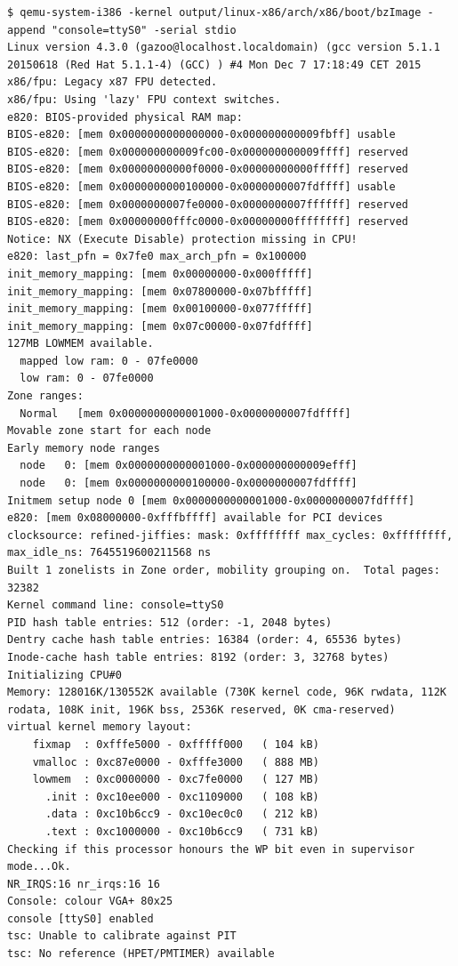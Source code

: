 \documentclass[a4paper]{article}
\begin{document}
\begin{verbatim}
$ qemu-system-i386 -kernel output/linux-x86/arch/x86/boot/bzImage -append "console=ttyS0" -serial stdio
Linux version 4.3.0 (gazoo@localhost.localdomain) (gcc version 5.1.1 20150618 (Red Hat 5.1.1-4) (GCC) ) #4 Mon Dec 7 17:18:49 CET 2015
x86/fpu: Legacy x87 FPU detected.
x86/fpu: Using 'lazy' FPU context switches.
e820: BIOS-provided physical RAM map:
BIOS-e820: [mem 0x0000000000000000-0x000000000009fbff] usable
BIOS-e820: [mem 0x000000000009fc00-0x000000000009ffff] reserved
BIOS-e820: [mem 0x00000000000f0000-0x00000000000fffff] reserved
BIOS-e820: [mem 0x0000000000100000-0x0000000007fdffff] usable
BIOS-e820: [mem 0x0000000007fe0000-0x0000000007ffffff] reserved
BIOS-e820: [mem 0x00000000fffc0000-0x00000000ffffffff] reserved
Notice: NX (Execute Disable) protection missing in CPU!
e820: last_pfn = 0x7fe0 max_arch_pfn = 0x100000
init_memory_mapping: [mem 0x00000000-0x000fffff]
init_memory_mapping: [mem 0x07800000-0x07bfffff]
init_memory_mapping: [mem 0x00100000-0x077fffff]
init_memory_mapping: [mem 0x07c00000-0x07fdffff]
127MB LOWMEM available.
  mapped low ram: 0 - 07fe0000
  low ram: 0 - 07fe0000
Zone ranges:
  Normal   [mem 0x0000000000001000-0x0000000007fdffff]
Movable zone start for each node
Early memory node ranges
  node   0: [mem 0x0000000000001000-0x000000000009efff]
  node   0: [mem 0x0000000000100000-0x0000000007fdffff]
Initmem setup node 0 [mem 0x0000000000001000-0x0000000007fdffff]
e820: [mem 0x08000000-0xfffbffff] available for PCI devices
clocksource: refined-jiffies: mask: 0xffffffff max_cycles: 0xffffffff, max_idle_ns: 7645519600211568 ns
Built 1 zonelists in Zone order, mobility grouping on.  Total pages: 32382
Kernel command line: console=ttyS0
PID hash table entries: 512 (order: -1, 2048 bytes)
Dentry cache hash table entries: 16384 (order: 4, 65536 bytes)
Inode-cache hash table entries: 8192 (order: 3, 32768 bytes)
Initializing CPU#0
Memory: 128016K/130552K available (730K kernel code, 96K rwdata, 112K rodata, 108K init, 196K bss, 2536K reserved, 0K cma-reserved)
virtual kernel memory layout:
    fixmap  : 0xfffe5000 - 0xfffff000   ( 104 kB)
    vmalloc : 0xc87e0000 - 0xfffe3000   ( 888 MB)
    lowmem  : 0xc0000000 - 0xc7fe0000   ( 127 MB)
      .init : 0xc10ee000 - 0xc1109000   ( 108 kB)
      .data : 0xc10b6cc9 - 0xc10ec0c0   ( 212 kB)
      .text : 0xc1000000 - 0xc10b6cc9   ( 731 kB)
Checking if this processor honours the WP bit even in supervisor mode...Ok.
NR_IRQS:16 nr_irqs:16 16
Console: colour VGA+ 80x25
console [ttyS0] enabled
tsc: Unable to calibrate against PIT
tsc: No reference (HPET/PMTIMER) available

\end{verbatim}
\end{document}
